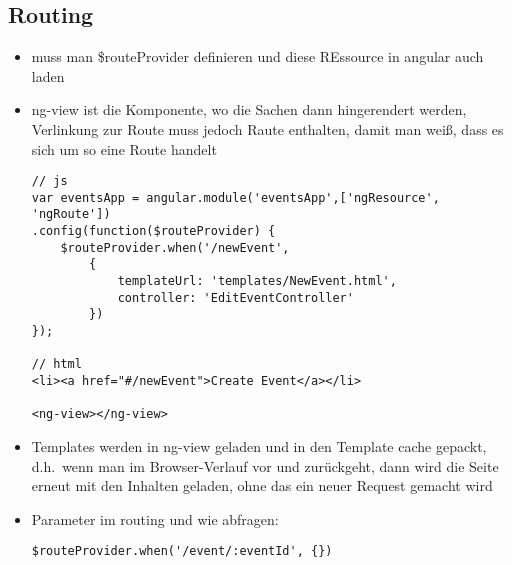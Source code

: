 \subsection{Routing}
\begin{itemize}
  \item muss man \$routeProvider definieren und diese REssource in angular auch laden
  \item ng-view ist die Komponente, wo die Sachen dann hingerendert werden, Verlinkung zur Route
    muss jedoch Raute enthalten, damit man weiß, dass es sich um so eine Route handelt
\begin{verbatim}
// js
var eventsApp = angular.module('eventsApp',['ngResource', 'ngRoute'])
.config(function($routeProvider) {
    $routeProvider.when('/newEvent',
        {
            templateUrl: 'templates/NewEvent.html',
            controller: 'EditEventController'
        })
});

// html
<li><a href="#/newEvent">Create Event</a></li>

<ng-view></ng-view>

\end{verbatim}

  \item Templates werden in ng-view geladen und in den Template cache gepackt, d.h.\ wenn man im
    Browser-Verlauf vor und zurückgeht, dann wird die Seite erneut mit den Inhalten geladen, ohne
    das ein neuer Request gemacht wird
  \item Parameter im routing und wie abfragen:
\begin{verbatim}
$routeProvider.when('/event/:eventId', {})
\end{verbatim}


\end{itemize}

